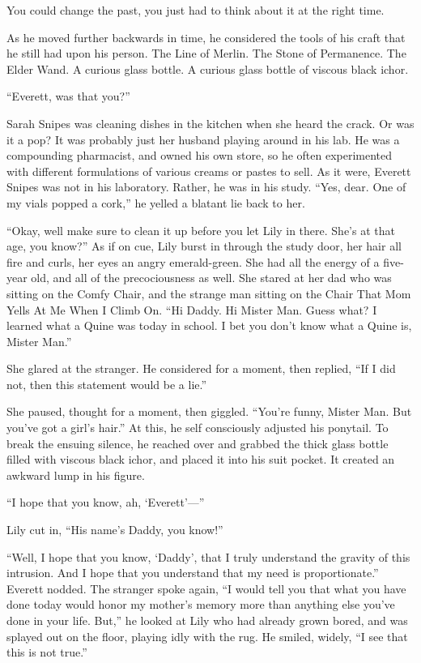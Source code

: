 You could change the past, you just had to think about it at the right time.

As he moved further backwards in time, he considered the tools of his craft that he still had upon his person. The Line of Merlin. The Stone of Permanence. The Elder Wand. A curious glass bottle.
\SmallVSpace
A curious glass bottle of viscous black ichor.

\simpleline


“Everett, was that you?”

Sarah Snipes was cleaning dishes in the kitchen when she heard the crack. Or was it a pop? It was probably just her husband playing around in his lab. He was a compounding pharmacist, and owned his own store, so he often experimented with different formulations of various creams or pastes to sell.
\SmallVSpace
As it were, Everett Snipes was not in his laboratory. Rather, he was in his study. “Yes, dear. One of my vials popped a cork,” he yelled a blatant lie back to her.

“Okay, well make sure to clean it up before you let Lily in there. She’s at that age, you know?”
\SmallVSpace
As if on cue, Lily burst in through the study door, her hair all fire and curls, her eyes an angry emerald-green. She had all the energy of a five-year old, and all of the precociousness as well. She stared at her dad who was sitting on the Comfy Chair, and the strange man sitting on the Chair That Mom Yells At Me When I Climb On. “Hi Daddy. Hi Mister Man. Guess what? I learned what a Quine was today in school. I bet you don’t know what a Quine is, Mister Man.”

She glared at the stranger. He considered for a moment, then replied, “If I did not, then this statement would be a lie.”

She paused, thought for a moment, then giggled. “You’re funny, Mister Man. But you’ve got a girl’s hair.” At this, he self consciously adjusted his ponytail. To break the ensuing silence, he reached over and grabbed the thick glass bottle filled with viscous black ichor, and placed it into his suit pocket. It created an awkward lump in his figure.

“I hope that you know, ah, ‘Everett’\mbox{---}”

Lily cut in, “His name’s Daddy, you know!”

“Well, I hope that you know, ‘Daddy’, that I truly understand the gravity of this intrusion. And I hope that you understand that my need is proportionate.”
\SmallVSpace
Everett nodded.
\SmallVSpace
The stranger spoke again, “I would tell you that what you have done today would honor my mother’s memory more than anything else you’ve done in your life. But,” he looked at Lily who had already grown bored, and was splayed out on the floor, playing idly with the rug. He smiled, widely, “I see that this is not true.”

